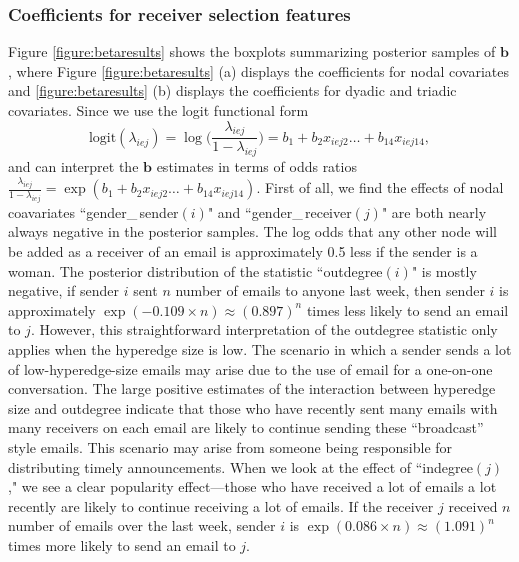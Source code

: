 \documentclass[ba]{imsart}
\numberwithin{equation}{section}
\theoremstyle{plain}
\begin{document}
	\subsubsection{Coefficients for receiver selection features}
	Figure \ref{figure:betaresults} shows the boxplots summarizing posterior samples of $\boldsymbol{b}$, where Figure \ref{figure:betaresults} (a) displays the coefficients for nodal covariates and \ref{figure:betaresults} (b) displays the coefficients for dyadic and triadic covariates. Since we use the logit functional form 
	\begin{equation*}
		\mbox{logit}(\lambda_{iej})=\log\Big(\frac{\lambda_{iej}}{1-\lambda_{iej}}\Big) =b_{1}+b_{2} x_{iej2}\ldots+b_{14}x_{iej14},
	\end{equation*}
	and can interpret the $\boldsymbol{b}$ estimates in terms of odds ratios $\frac{\lambda_{iej}}{1-\lambda_{iej}}=\exp(b_{1}+b_{2} x_{iej2}\ldots+b_{14}x_{iej14})$. First of all, we find the effects of nodal coavariates ``gender\_\,sender$(i)$" and ``gender\_\,receiver$(j)$" are both nearly always negative in the posterior samples. The log odds that any other node will be added as a receiver of an email is approximately 0.5 less if the sender is a woman. The posterior distribution of the statistic ``outdegree$(i)$" is mostly negative, if sender $i$ sent $n$ number of emails to anyone last week, then sender $i$ is approximately $\exp(-0.109\times n)\approx(0.897)^n$ times less likely to send an email to $j$. However, this straightforward interpretation of the outdegree statistic only applies when the hyperedge size is low. The scenario in which a sender sends a lot of low-hyperedge-size emails may arise due to the use of email for a one-on-one conversation. The large positive estimates of the interaction between hyperedge size and outdegree indicate that those who have recently sent many emails with many receivers on each email are likely to continue sending these ``broadcast'' style emails. This scenario may arise from someone being responsible for distributing timely announcements. When we look at the effect of ``indegree$(j)$," we see a clear popularity effect---those who have received a lot of emails a lot recently are likely to continue receiving a lot of emails. If the receiver $j$ received $n$ number of emails over the last week, sender $i$ is $\exp(0.086\times n)\approx(1.091)^n $ times more likely to send an email to $j$. 
		
\end{document}
